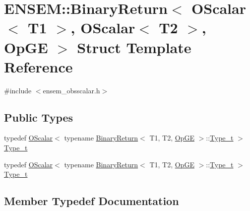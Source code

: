 \hypertarget{structENSEM_1_1BinaryReturn_3_01OScalar_3_01T1_01_4_00_01OScalar_3_01T2_01_4_00_01OpGE_01_4}{}\section{E\+N\+S\+EM\+:\+:Binary\+Return$<$ O\+Scalar$<$ T1 $>$, O\+Scalar$<$ T2 $>$, Op\+GE $>$ Struct Template Reference}
\label{structENSEM_1_1BinaryReturn_3_01OScalar_3_01T1_01_4_00_01OScalar_3_01T2_01_4_00_01OpGE_01_4}


{\ttfamily \#include $<$ensem\+\_\+obsscalar.\+h$>$}

\subsection*{Public Types}
\begin{DoxyCompactItemize}
\item 
typedef \mbox{\hyperlink{classENSEM_1_1OScalar}{O\+Scalar}}$<$ typename \mbox{\hyperlink{structENSEM_1_1BinaryReturn}{Binary\+Return}}$<$ T1, T2, \mbox{\hyperlink{structENSEM_1_1OpGE}{Op\+GE}} $>$\+::\mbox{\hyperlink{structENSEM_1_1BinaryReturn_3_01OScalar_3_01T1_01_4_00_01OScalar_3_01T2_01_4_00_01OpGE_01_4_abf5aa98967250f1ae5173d497d544c12}{Type\+\_\+t}} $>$ \mbox{\hyperlink{structENSEM_1_1BinaryReturn_3_01OScalar_3_01T1_01_4_00_01OScalar_3_01T2_01_4_00_01OpGE_01_4_abf5aa98967250f1ae5173d497d544c12}{Type\+\_\+t}}
\item 
typedef \mbox{\hyperlink{classENSEM_1_1OScalar}{O\+Scalar}}$<$ typename \mbox{\hyperlink{structENSEM_1_1BinaryReturn}{Binary\+Return}}$<$ T1, T2, \mbox{\hyperlink{structENSEM_1_1OpGE}{Op\+GE}} $>$\+::\mbox{\hyperlink{structENSEM_1_1BinaryReturn_3_01OScalar_3_01T1_01_4_00_01OScalar_3_01T2_01_4_00_01OpGE_01_4_abf5aa98967250f1ae5173d497d544c12}{Type\+\_\+t}} $>$ \mbox{\hyperlink{structENSEM_1_1BinaryReturn_3_01OScalar_3_01T1_01_4_00_01OScalar_3_01T2_01_4_00_01OpGE_01_4_abf5aa98967250f1ae5173d497d544c12}{Type\+\_\+t}}
\end{DoxyCompactItemize}


\subsection{Member Typedef Documentation}
\mbox{\label{structENSEM_1_1BinaryReturn_3_01OScalar_3_01T1_01_4_00_01OScalar_3_01T2_01_4_00_01OpGE_01_4_abf5aa98967250f1ae5173d497d544c12}} 
